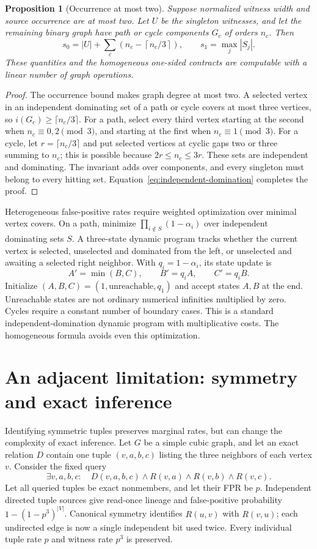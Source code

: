 \documentclass[11pt]{article}
\newtheorem{proposition}[theorem]{Proposition}
\begin{document}
\begin{proposition}[Occurrence at most two]
Suppose normalized witness width and source occurrence are at most two.
Let $U$ be the singleton witnesses, and let the remaining binary graph
have path or cycle components $G_c$ of orders $n_c$. Then
\[
 s_0=|U|+\sum_c\left(n_c-\left\lceil n_c/3\right\rceil\right),
 \qquad s_1=\max_j|S_j|.
\]
These quantities and the homogeneous one-sided contracts are computable
with a linear number of graph operations.
\end{proposition}

\begin{proof}
The occurrence bound makes graph degree at most two. A selected vertex in
an independent dominating set of a path or cycle covers at most three
vertices, so $i(G_c)\geq\lceil n_c/3\rceil$.
For a path, select every third vertex starting at the second when
$n_c\equiv0,2\pmod3$, and starting at the first when $n_c\equiv1\pmod3$.
For a cycle, let $r=\lceil n_c/3\rceil$ and put selected vertices at cyclic
gaps two or three summing to $n_c$; this is possible because
$2r\leq n_c\leq3r$. These sets are independent and dominating.
The invariant adds over components, and every singleton must belong to
every hitting set. Equation~\eqref{eq:independent-domination} completes the proof.
\end{proof}

Heterogeneous false-positive rates require weighted optimization over
minimal vertex covers. On a path, minimize
$\prod_{i\notin S}(1-\alpha_i)$ over independent dominating sets $S$.
A three-state dynamic program tracks whether the current vertex is selected,
unselected and dominated from the left, or unselected and awaiting a selected
right neighbor. With $q_i=1-\alpha_i$, its state update is
\[
 A'=\min(B,C),\qquad B'=q_iA,\qquad C'=q_iB.
\]
Initialize $(A,B,C)=(1,\text{unreachable},q_1)$ and accept states $A,B$
at the end. Unreachable states are not ordinary numerical infinities
multiplied by zero. Cycles require a constant number of boundary cases.
This is a standard independent-domination dynamic program with multiplicative
costs. The homogeneous formula avoids even this optimization.

\section{An adjacent limitation: symmetry and exact inference}

Identifying symmetric tuples preserves marginal rates, but can change the
complexity of exact inference. Let $G$ be a simple cubic graph, and let an
exact relation $D$ contain one tuple $(v,a,b,c)$ listing the three neighbors
of each vertex $v$. Consider the fixed query
\[
 \exists v,a,b,c:\quad D(v,a,b,c)\land R(v,a)\land R(v,b)\land R(v,c).
\]
Let all queried tuples be exact nonmembers, and let their FPR be $p$.
Independent directed tuple sources give read-once lineage and false-positive
probability $1-(1-p^3)^{|V|}$. Canonical symmetry identifies $R(u,v)$ with
$R(v,u)$; each undirected edge is now a single independent bit used twice.
Every individual tuple rate $p$ and witness rate $p^3$ is preserved.
\end{document}
